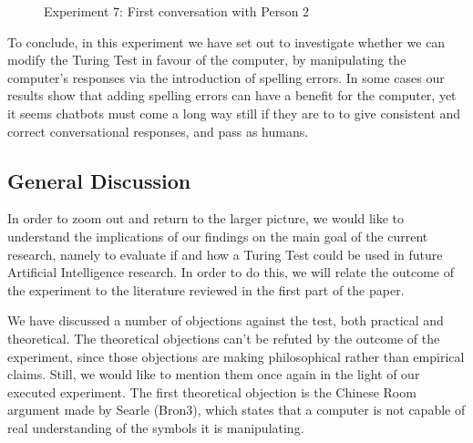 \begin{figure}[ht]
   \begin{center}
   \end{center}
   \caption{Experiment 7: First conversation with Person 2}
   \label{convex5}
\end{figure}

To conclude, in this experiment we have set out to investigate whether we can modify the Turing Test in favour of the computer, by manipulating the computer's responses via the introduction of spelling errors. In some cases our results show that adding spelling errors can have a benefit for the computer, yet it seems chatbots must come a long way still if they are to to give consistent and correct conversational responses, and pass as humans.


\subsection{General Discussion}
In order to zoom out and return to the larger picture, we would like to understand the implications of our findings on the main goal of the current research, namely to evaluate if and how a Turing Test could be used in future Artificial Intelligence research. In order to do this, we will relate the outcome of the experiment to the literature reviewed in the first part of the paper.

We have discussed a number of objections against the test, both practical and theoretical. The theoretical objections can't be refuted by the outcome of the experiment, since those objections are making philosophical rather than empirical claims. Still, we would like to mention them once again in the light of our executed experiment. The first theoretical objection is the Chinese Room argument made by Searle (Bron3), which states that a computer is not capable of real understanding of the symbols it is manipulating.

